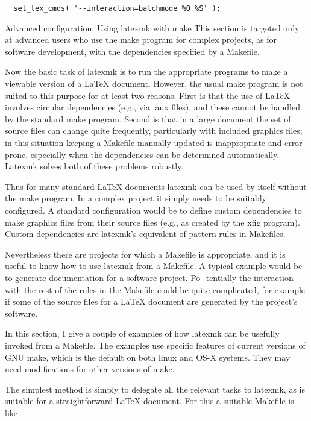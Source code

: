 \begin{verbatim}
  set_tex_cmds( '--interaction=batchmode %O %S' );
\end{verbatim}

Advanced configuration: Using latexmk with make This section is targeted only
at advanced users who use the  make  program for complex projects, as for
software development, with the dependencies specified by a Makefile.

Now the basic task of latexmk is to run  the  appropriate  programs  to make  a
viewable version of a LaTeX document.  However, the usual make program is not
suited to this purpose for at least two reasons.   First is that the use of
LaTeX involves circular dependencies (e.g., via .aux files), and these cannot
be handled by the standard make program.  Second  is  that  in  a  large
document the set of source files can change quite frequently, particularly with
included graphics  files;  in  this situation  keeping a Makefile manually
updated is inappropriate and error-prone, especially when the dependencies
can be determined automatically.  Latexmk solves both of these problems
robustly.

Thus  for  many  standard LaTeX documents latexmk can be used by itself without
the make program. In a complex project it simply needs  to  be suitably
configured.  A standard configuration would be to define custom dependencies to
make graphics files from their source files  (e.g., as  created  by  the  xfig
program).  Custom dependencies are latexmk's equivalent of pattern rules in
Makefiles.

Nevertheless there are projects for which a  Makefile  is  appropriate,
and it is useful to know how to use latexmk from a Makefile.  A typical
example would be to generate documentation for a software project.  Po-
tentially  the  interaction  with the rest of the rules in the Makefile
could be quite complicated, for example if some of the source files for
a LaTeX document are generated by the project's software.

In this section, I give a couple of examples of how latexmk can be usefully
invoked from a Makefile.  The examples use specific  features  of current
versions  of  GNU make, which is the default on both linux and OS-X systems.
They may need modifications for other versions of make.

The simplest method is simply to delegate all the relevant tasks to latexmk, as
is suitable for a straightforward LaTeX document.  For this a suitable Makefile
is like

